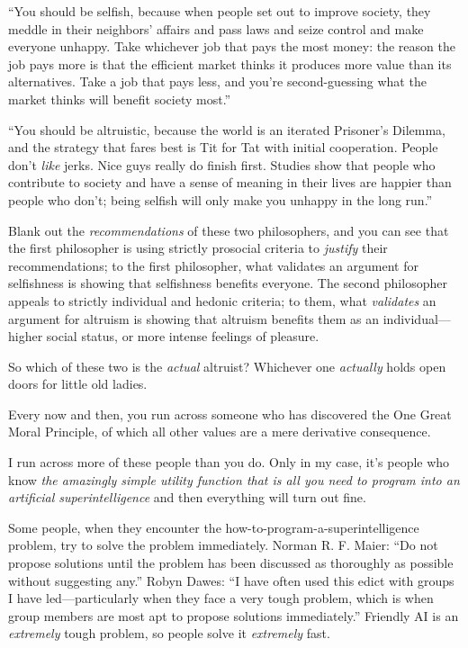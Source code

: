 {
 ``You should be selfish, because when people set
out to improve society, they meddle in their neighbors'
affairs and pass laws and seize control and make everyone unhappy. Take
whichever job that pays the most money: the reason the job pays more is
that the efficient market thinks it produces more value than its
alternatives. Take a job that pays less, and you're
second-guessing what the market thinks will benefit society
most.''}

{
 ``You should be altruistic, because the world is
an iterated Prisoner's Dilemma, and the strategy that
fares best is Tit for Tat with initial cooperation. People
don't \textit{like} jerks. Nice guys really do finish
first. Studies show that people who contribute to society and have a
sense of meaning in their lives are happier than people who
don't; being selfish will only make you unhappy in the
long run.''}

{
 Blank out the \textit{recommendations} of these two philosophers,
and you can see that the first philosopher is using strictly prosocial
criteria to \textit{justify} their recommendations; to the first
philosopher, what validates an argument for selfishness is showing that
selfishness benefits everyone. The second philosopher appeals to
strictly individual and hedonic criteria; to them, what
\textit{validates} an argument for altruism is showing that altruism
benefits them as an individual---higher social status, or more intense
feelings of pleasure.}

{
 So which of these two is the \textit{actual} altruist? Whichever
one \textit{actually} holds open doors for little old ladies.}

\myendsectiontext


{
 Every now and then, you run across someone who has discovered the
One Great Moral Principle, of which all other values are a mere
derivative consequence. }

{
 I run across more of these people than you do. Only in my case,
it's people who know \textit{the amazingly simple
utility function that is all you need to program into an artificial
superintelligence} and then everything will turn out fine.}

{
 Some people, when they encounter the
how-to-program-a-superintelligence problem, try to solve the problem
immediately. Norman R. F. Maier: ``Do not propose
solutions until the problem has been discussed as thoroughly as
possible without suggesting any.'' Robyn Dawes:
``I have often used this edict with groups I have
led---particularly when they face a very tough problem, which is when
group members are most apt to propose solutions
immediately.'' Friendly AI is an \textit{extremely}
tough problem, so people solve it \textit{extremely} fast.}


